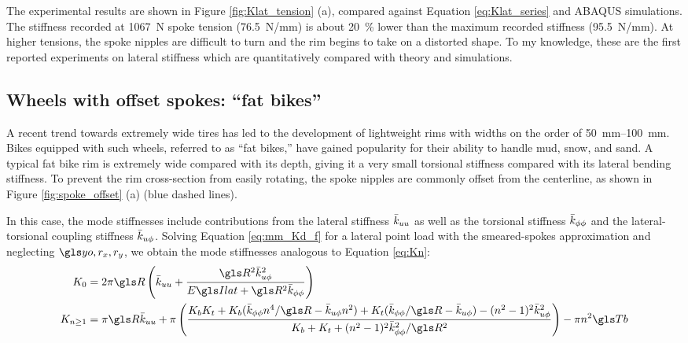 \documentclass[\rootdir/thesis.tex]{subfiles}
\begin{document}
The experimental results are shown in Figure \ref{fig:Klat_tension} (a), compared against Equation \eqref{eq:Klat_series} and ABAQUS simulations. The stiffness recorded at \SI{1067}{N} spoke tension (\SI{76.5}{N/mm}) is about \SI{20}{\percent} lower than the maximum recorded stiffness (\SI{95.5}{N/mm}). At higher tensions, the spoke nipples are difficult to turn and the rim begins to take on a distorted shape. To my knowledge, these are the first reported experiments on lateral stiffness which are quantitatively compared with theory and simulations.


\subsection{Wheels with offset spokes: ``fat bikes''}

A recent trend towards extremely wide tires has led to the development of lightweight rims with widths on the order of \SIrange{50}{100}{mm}. Bikes equipped with such wheels, referred to as ``fat bikes,'' have gained popularity for their ability to handle mud, snow, and sand. A typical fat bike rim is extremely wide compared with its depth, giving it a very small torsional stiffness compared with its lateral bending stiffness. To prevent the rim cross-section from easily rotating, the spoke nipples are commonly offset from the centerline, as shown in Figure \ref{fig:spoke_offset} (a) (blue dashed lines).

In this case, the mode stiffnesses include contributions from the lateral stiffness $\bar{k}_{uu}$ as well as the torsional stiffness $\bar{k}_{\phi\phi}$ and the lateral-torsional coupling stiffness $\bar{k}_{u\phi}$. Solving Equation \eqref{eq:mm_Kd_f} for a lateral point load with the smeared-spokes approximation and neglecting $\yo, r_x, r_y$, we obtain the mode stiffnesses analogous to Equation \eqref{eq:Kn}:
\begin{subequations}\label{eq:Kn_offset}
\begin{align}
K_0 &= 2\pi\R \left(\kuu + \frac{\R^2\kup^2}{\EIl + \R^2\kpp}\right)\\
K_{n\geq1} & = \pi\R\kuu + \pi\left(\frac{\Kbend \Ktors +
                                          \Kbend(\kpp n^4/\R - \kup n^2) +
                                          \Ktors(\kpp/\R-\kup) -
                                          (n^2-1)^2\kup^2}
                                    {\Kbend + \Ktors + (n^2-1)^2\kpp^2/\R^2}\right)- \pi n^2 \Tb
\end{align}
\end{subequations}
\end{document}
